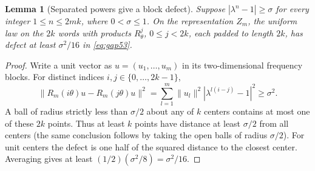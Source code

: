 \documentclass[11pt]{amsart}
\numberwithin{equation}{section}
\newtheorem{lemma}[theorem]{Lemma}
\theoremstyle{definition}
\theoremstyle{remark}
\newcommand{\norm}[1]{\lVert #1\rVert}
\begin{document}
\begin{lemma}[Separated powers give a block defect]\label{lem:separated53}
Suppose $|\lambda^n-1|\ge\sigma$ for every integer $1\le n\le2mk$, where $0<\sigma\le1$. On the representation $Z_m$, the uniform law on the $2k$ words with products $R_\theta^j$, $0\le j<2k$, each padded to length $2k$, has defect at least $\sigma^2/16$ in \eqref{eq:gap53}.
\end{lemma}
\begin{proof}
Write a unit vector as $u=(u_1,\ldots,u_m)$ in its two-dimensional frequency blocks. For distinct indices $i,j\in\{0,\ldots,2k-1\}$,
\[
 \norm{R_m(i\theta)u-R_m(j\theta)u}^2
 =\sum_{l=1}^m\norm{u_l}^2|\lambda^{l(i-j)}-1|^2\ge\sigma^2.
\]
A ball of radius strictly less than $\sigma/2$ about any of $k$ centers contains at most one of these $2k$ points. Thus at least $k$ points have distance at least $\sigma/2$ from all centers (the same conclusion follows by taking the open balls of radius $\sigma/2$). For unit centers the defect is one half of the squared distance to the closest center. Averaging gives at least $(1/2)(\sigma^2/8)=\sigma^2/16$.
\end{proof}
\end{document}
